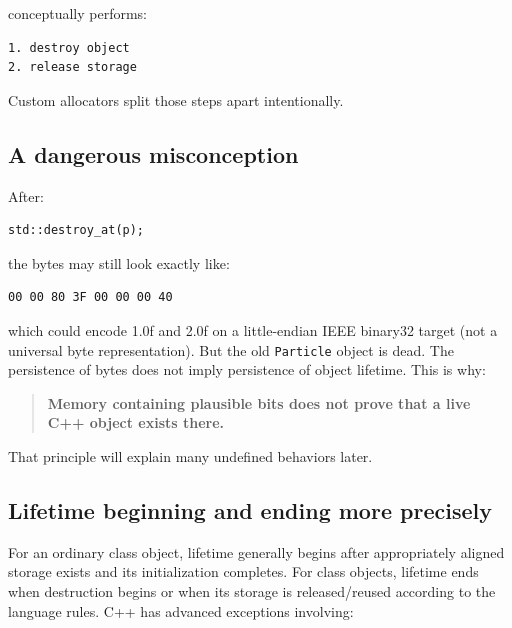 conceptually performs:

\begin{verbatim}
1. destroy object
2. release storage
\end{verbatim}

Custom allocators split those steps apart intentionally.

\subsection{A dangerous misconception}\label{05-engine-i-ch002-a-dangerous-misconception}

\hypertarget{05-engine-i-ch002-a-dangerous-misconception}{}

After:

\begin{verbatim}
std::destroy_at(p);
\end{verbatim}

the bytes may still look exactly like:

\begin{verbatim}
00 00 80 3F 00 00 00 40
\end{verbatim}

which could encode 1.0f and 2.0f on a little-endian IEEE binary32 target (not a universal byte representation). But the old \texttt{Particle} object is dead. The persistence of bytes does not imply persistence of object lifetime. This is why:

\begin{quote}
\textbf{Memory containing plausible bits does not prove that a live C++ object exists there.}
\end{quote}

That principle will explain many undefined behaviors later.

\subsection{Lifetime beginning and ending more precisely}\label{05-engine-i-ch002-lifetime-beginning-and-ending-more-precisely}

\hypertarget{05-engine-i-ch002-lifetime-beginning-and-ending-more-precisely}{}

For an ordinary class object, lifetime generally begins after appropriately aligned storage exists and its initialization completes. For class objects, lifetime ends when destruction begins or when its storage is released/reused according to the language rules. C++ has advanced exceptions involving:

